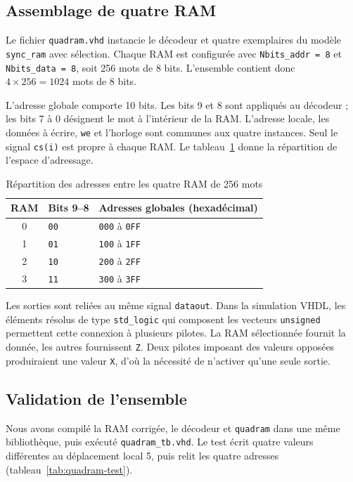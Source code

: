 \subsection{Assemblage de quatre RAM}

Le fichier \texttt{quadram.vhd} instancie le décodeur et quatre exemplaires du modèle
\texttt{sync\_ram} avec sélection. Chaque RAM est configurée avec
\texttt{Nbits\_addr = 8} et \texttt{Nbits\_data = 8}, soit 256 mots de 8 bits. L'ensemble
contient donc $4\times256=1024$ mots de 8 bits.

L'adresse globale comporte 10 bits. Les bits 9 et 8 sont appliqués au décodeur ; les
bits 7 à 0 désignent le mot à l'intérieur de la RAM. L'adresse locale, les données à
écrire, \texttt{we} et l'horloge sont communes aux quatre instances. Seul le signal
\texttt{cs(i)} est propre à chaque RAM. Le tableau~\ref{tab:quadram-adresses} donne la
répartition de l'espace d'adressage.

\begin{table}[H]
\centering
\begin{tabular}{cll}
\toprule
RAM & Bits 9--8 & Adresses globales (hexadécimal) \\
\midrule
0 & \texttt{00} & \texttt{000} à \texttt{0FF} \\
1 & \texttt{01} & \texttt{100} à \texttt{1FF} \\
2 & \texttt{10} & \texttt{200} à \texttt{2FF} \\
3 & \texttt{11} & \texttt{300} à \texttt{3FF} \\
\bottomrule
\end{tabular}
\caption{Répartition des adresses entre les quatre RAM de 256 mots}
\label{tab:quadram-adresses}
\end{table}

Les sorties sont reliées au même signal \texttt{dataout}. Dans la simulation VHDL, les
éléments résolus de type \texttt{std\_logic} qui composent les vecteurs \texttt{unsigned}
permettent cette connexion à plusieurs pilotes. La RAM sélectionnée fournit la donnée,
les autres fournissent \texttt{Z}. Deux pilotes imposant des valeurs opposées produiraient
une valeur \texttt{X}, d'où la nécessité de n'activer qu'une seule sortie.

\subsection{Validation de l'ensemble}

Nous avons compilé la RAM corrigée, le décodeur et \texttt{quadram} dans une même
bibliothèque, puis exécuté \texttt{quadram\_tb.vhd}. Le test écrit quatre valeurs différentes
au déplacement local 5, puis relit les quatre adresses (tableau~\ref{tab:quadram-test}).

